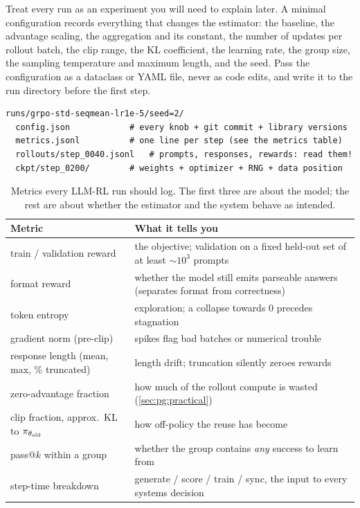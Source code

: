 Treat every run as an experiment you will need to explain later. A minimal configuration
records everything that changes the estimator: the baseline, the advantage scaling, the
aggregation and its constant, the number of updates per rollout batch, the clip range,
the KL coefficient, the learning rate, the group size, the sampling temperature and maximum
length, and the seed. Pass the configuration as a dataclass or YAML file, never as code edits,
and write it to the run directory before the first step.

\begin{lstlisting}[style=plain,caption={A run directory that makes RL experiments reproducible and comparable.},label={lst:pg:rundir}]
runs/grpo-std-seqmean-lr1e-5/seed=2/
  config.json            # every knob + git commit + library versions
  metrics.jsonl          # one line per step (see the metrics table)
  rollouts/step_0040.jsonl   # prompts, responses, rewards: read them!
  ckpt/step_0200/        # weights + optimizer + RNG + data position
\end{lstlisting}

\begin{table}[ht]
\centering\small
\begin{tabularx}{\linewidth}{@{}lX@{}}
\toprule
Metric & What it tells you\\
\midrule
train / validation reward & the objective; validation on a fixed held-out set of at least $\sim10^3$ prompts\\
format reward & whether the model still emits parseable answers (separates format from correctness)\\
token entropy & exploration; a collapse towards 0 precedes stagnation\\
gradient norm (pre-clip) & spikes flag bad batches or numerical trouble\\
response length (mean, max, \% truncated) & length drift; truncation silently zeroes rewards\\
zero-advantage fraction & how much of the rollout compute is wasted (\cref{sec:pg:practical})\\
clip fraction, approx.\ KL to $\pi_{\theta_{\text{old}}}$ & how off-policy the reuse has become\\
pass@$k$ within a group & whether the group contains \emph{any} success to learn from\\
step-time breakdown & generate / score / train / sync, the input to every systems decision\\
\bottomrule
\end{tabularx}
\caption{Metrics every LLM-RL run should log. The first three are about the model; the rest are
about whether the estimator and the system behave as intended.}
\label{tab:pg:metrics}
\end{table}

